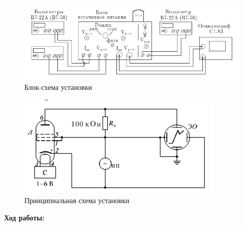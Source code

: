 \documentclass[a4paper, 12pt]{article}%
\begin{document}
	\begin{figure}[H]
		\centering
		\includegraphics[width=1\linewidth]{ust1}
		\caption{Блок-схема установки}
	\end{figure}

	\begin{figure}[H]
		\centering
		\includegraphics[width=0.6\linewidth]{ust}
		\caption{Принципиальная схема установки}
	\end{figure}
	
	
	\newpage
	
	\textbf{Ход работы: }\\
	
\end{document}
